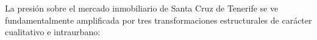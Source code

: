 




La presión sobre el mercado inmobiliario de Santa Cruz de Tenerife se ve fundamentalmente amplificada por tres transformaciones estructurales de carácter cualitativo e intraurbano:


